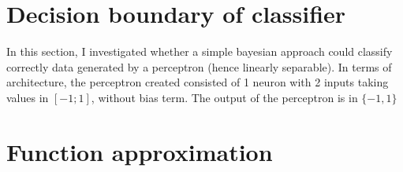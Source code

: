 \documentclass[11pt, a4paper]{article}
\begin{document}
\section{Decision boundary of classifier}

In this section, I investigated whether a simple bayesian approach
could classify correctly data generated by a perceptron (hence
linearly separable). In terms of architecture, the perceptron created
consisted of 1 neuron with 2 inputs taking values in $[-1; 1]$,
without bias term. The output of the perceptron is in $\{-1, 1\}$

\section{Function approximation}

 

\end{document}
